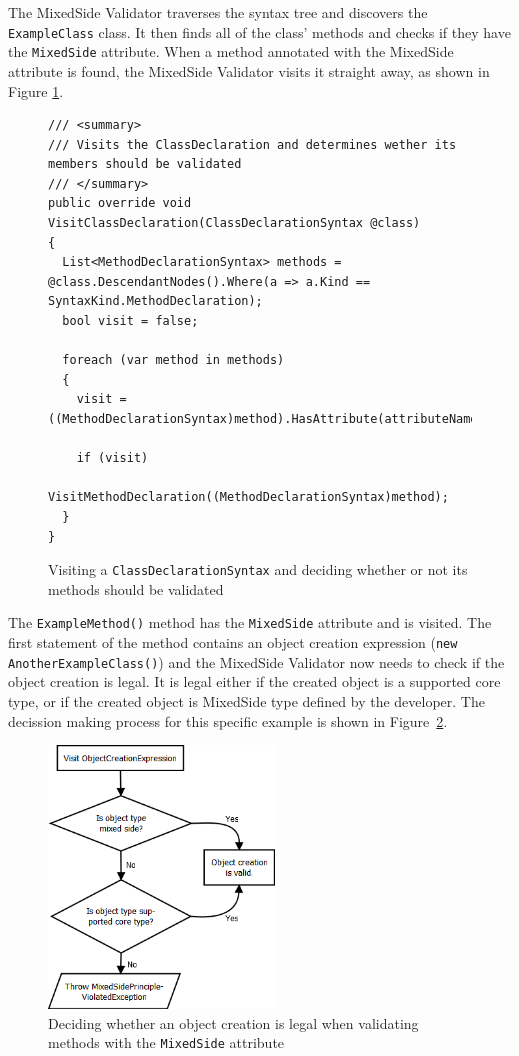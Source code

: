 The MixedSide Validator traverses the syntax tree and discovers the \texttt{ExampleClass} class. It then finds all of the class' methods and checks if they have the \texttt{MixedSide} attribute. When a method annotated with the MixedSide attribute is found, the MixedSide Validator visits it straight away, as shown in Figure \ref{fig:ValidatorVisitClassDeclaration}. 

\begin{figure}[H]
	\begin{lstlisting}[language=CSharp,classoffset=1,morekeywords={ClassDeclarationSyntax,SyntaxKind,MethodDeclarationSyntax,List}]
/// <summary>
/// Visits the ClassDeclaration and determines wether its members should be validated
/// </summary>
public override void VisitClassDeclaration(ClassDeclarationSyntax @class)
{
  List<MethodDeclarationSyntax> methods = @class.DescendantNodes().Where(a => a.Kind == SyntaxKind.MethodDeclaration);
  bool visit = false;

  foreach (var method in methods)
  {
    visit = ((MethodDeclarationSyntax)method).HasAttribute(attributeName);

    if (visit)
      VisitMethodDeclaration((MethodDeclarationSyntax)method);
  }
}
	\end{lstlisting}
	\caption{Visiting a \texttt{ClassDeclarationSyntax} and deciding whether or not its methods should be validated}
	\label{fig:ValidatorVisitClassDeclaration}
\end{figure}


The \texttt{ExampleMethod()} method has the \texttt{MixedSide} attribute and is visited. The first statement of the method contains an object creation expression (\texttt{new AnotherExampleClass()}) and the MixedSide Validator now needs to check if the object creation is legal. It is legal either if the created object is a supported core type, or if the created object is MixedSide type defined by the developer. The decission making process for this specific example is shown in Figure~\ref{fig:isobjectcreationvalid}.

\begin{figure}[H]
	\begin{center}
		\includegraphics[width=6cm]{resources/images/ValidationFlowchart.png}
		\caption{Deciding whether an object creation is legal when validating methods with the \texttt{MixedSide} attribute}
		\label{fig:isobjectcreationvalid}
	\end{center}
\end{figure}


